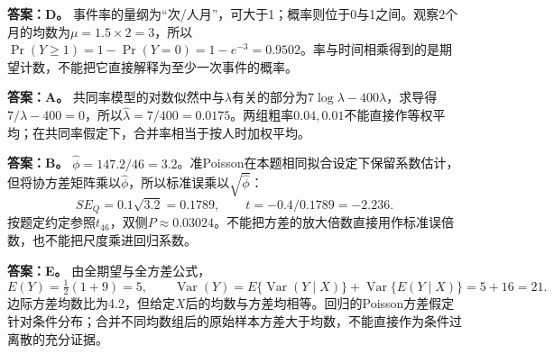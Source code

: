 \textbf{答案：D。} 事件率的量纲为“次/人月”，可大于1；概率则位于0与1之间。观察2个月的均数为$\mu=1.5\times2=3$，所以$\Pr(Y\ge1)=1-\Pr(Y=0)=1-e^{-3}=0.9502$。率与时间相乘得到的是期望计数，不能把它直接解释为至少一次事件的概率。
\par\nobreak\smallskip{}

\textbf{答案：A。} 共同率模型的对数似然中与$\lambda$有关的部分为$7\log\lambda-400\lambda$，求导得$7/\lambda-400=0$，所以$\widehat\lambda=7/400=0.0175$。两组粗率$0.04,0.01$不能直接作等权平均；在共同率假定下，合并率相当于按人时加权平均。
\par\nobreak\smallskip{}

\textbf{答案：B。} $\widehat\phi=147.2/46=3.2$。准Poisson在本题相同拟合设定下保留系数估计，但将协方差矩阵乘以$\widehat\phi$，所以标准误乘以$\sqrt{\widehat\phi}$：\[SE_Q=0.1\sqrt{3.2}=0.1789,\qquad t=-0.4/0.1789=-2.236.\]按题定约定参照$t_{46}$，双侧$P\approx0.03024$。不能把方差的放大倍数直接用作标准误倍数，也不能把尺度乘进回归系数。
\par\nobreak\smallskip{}

\textbf{答案：E。} 由全期望与全方差公式，\[E(Y)=\tfrac12(1+9)=5,\qquad \operatorname{Var}(Y)=E\{\operatorname{Var}(Y\mid X)\}+\operatorname{Var}\{E(Y\mid X)\}=5+16=21.\]边际方差均数比为4.2，但给定$X$后的均数与方差均相等。回归的Poisson方差假定针对条件分布；合并不同均数组后的原始样本方差大于均数，不能直接作为条件过离散的充分证据。
\par\nobreak\smallskip{}

